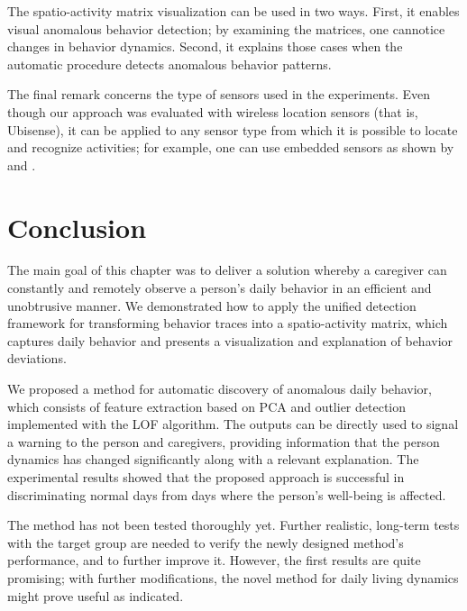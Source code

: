 The spatio-activity matrix visualization can be used in two ways. First, it enables visual anomalous behavior detection; by examining the matrices, one cannotice changes in behavior dynamics. Second, it explains those cases when the automatic procedure detects anomalous behavior patterns.

The final remark concerns the type of sensors used in the experiments. Even though our approach was evaluated with wireless location sensors (that is, Ubisense), it can be applied to any sensor type from which it is possible to locate and recognize activities; for example, one can use embedded sensors as shown by \cite{Cook2012} and \cite{Storf}. 

\section{Conclusion}
\label{sec:conclusion}

The main goal of this chapter was to deliver a solution whereby a caregiver can constantly and remotely observe a person's daily behavior in an efficient and unobtrusive manner. We demonstrated how to apply the unified detection framework for transforming behavior traces into a spatio-activity matrix, which captures daily behavior and presents a visualization and explanation of behavior deviations. 

We proposed a method for automatic discovery of anomalous daily behavior, which consists of feature extraction based on PCA and outlier detection implemented with the LOF algorithm. The outputs can be directly used to signal a warning to the person and caregivers, providing information that the person dynamics has changed significantly along with a relevant explanation. 
%
The experimental results showed that the proposed approach is successful in discriminating normal days from days where the person's well-being is affected. 

The method has not been tested thoroughly yet. Further realistic, long-term tests with the target group are needed to verify the newly designed method's performance, and to further improve it. However, the first results are quite promising; with further modifications, the novel method for daily living dynamics might prove useful as indicated. 


